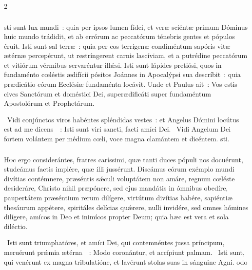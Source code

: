 \documentclass[9pt,twoside]{extarticle}
\begin{document}
\begin{multicols}{2}
{{\subsubsection*{\center {}}
sti sunt lux mundi~: quia per ipsos lumen fídei, et veræ sciéntæ primum Dóminus huic mundo trádidit, et ab errórum ac peccatórum ténebris gentes et pópulos éruit. Isti sunt sal terræ~: quia per eos terrígenæ condiméntum sapóris vitæ ætérnæ percepérunt, ut restríngerent carnis lascíviam, et a putrédine peccatórum et vitiórum vérmibus servaréntur illǽsi. Isti sunt lápides pretiósi, quos in fundaménto cœléstis ædifícii pósitos Joánnes in Apocalýpsi sua descríbit~: quia prædicátio eórum Ecclésiæ fundaménta locávit. Unde et Paulus ait~: Vos estis cives Sanctórum et doméstici Dei, superædificáti super fundaméntum Apostolórum et Prophetárum.

\begin{tightlist}{}
\item {}~Vidi conjúnctos viros habéntes spléndidas vestes~: et Angelus Dómini locútus est ad me dicens~~: \textred{*} Isti sunt viri sancti, facti amíci Dei.
~Vidi Angelum Dei fortem volántem per médium cœli, voce magna clamántem et dicéntem. sti.
\end{tightlist}

\subsubsection*{\center {}}
\lettrine{H}oc ergo considerántes, fratres caríssimi, quæ tanti duces pópuli nos docuérunt, studeámus factis implére, quæ illi jussérunt. Discámus eórum exémplo mundi divítias contémnere, præséntis sǽculi voluptátem non amáre, regnum cœléste desideráre, Christo nihil præpónere, sed ejus mandátis in ómnibus obedíre, paupertátem præséntium rerum dilígere, virtútum divítias habére, sapiéntiæ thesáurum appétere, spiritáles delícias quǽrere, nulli invidére, sed omnes hómines dilígere, amícos in Deo et inimícos propter Deum; quia hæc est vera et sola diléctio.

\begin{tightlist}{}
\item {}~Isti sunt triumphatóres, et amíci Dei, qui contemnéntes jussa príncipum, meruérunt prǽmia ætérna~~: \textred{*} Modo coronántur, et accípiunt palmam.
~Isti sunt, qui venérunt ex magna tribulatióne, et lavérunt stolas suas in sánguine Agni. odo
\end{tightlist}

}}
\end{multicols}
\end{document}
